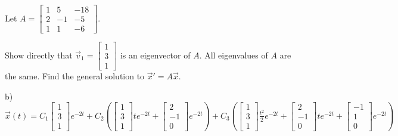 \begin{exercise}
Let $A=\begin{bmatrix} 1&5&-18\\ 2&-1&-5 \\ 1&1&-6 \end{bmatrix}$. 
\begin{tasks}
\task Show directly that $\vec{v}_1=\begin{bmatrix} 1\\3\\1 \end{bmatrix}$ is an eigenvector of $A$.
\task All eigenvalues of $A$ are the same. Find the general solution to ${\vec{x}}'=A\vec{x}$.
\end{tasks}
\end{exercise}
\comboSol{%
}
{%
b)~$\vec{x}(t) = C_1\left[\begin{smallmatrix} 1 \\ 3 \\1 \end{smallmatrix}\right]e^{-2t} + C_2\left(\left[\begin{smallmatrix} 1 \\ 3 \\ 1 \end{smallmatrix}\right] te^{-2t} + \left[\begin{smallmatrix} 2 \\ -1 \\ 0 \end{smallmatrix}\right]e^{-2t}\right) + C_3\left( \left[\begin{smallmatrix} 1 \\ 3 \\1 \end{smallmatrix}\right] \frac{t^2}{2}e^{-2t} + \left[\begin{smallmatrix} 2 \\ -1 \\ 0 \end{smallmatrix}\right]te^{-2t} + \left[\begin{smallmatrix} -1 \\ 1 \\ 0 \end{smallmatrix}\right] e^{-2t}\right)$
}


